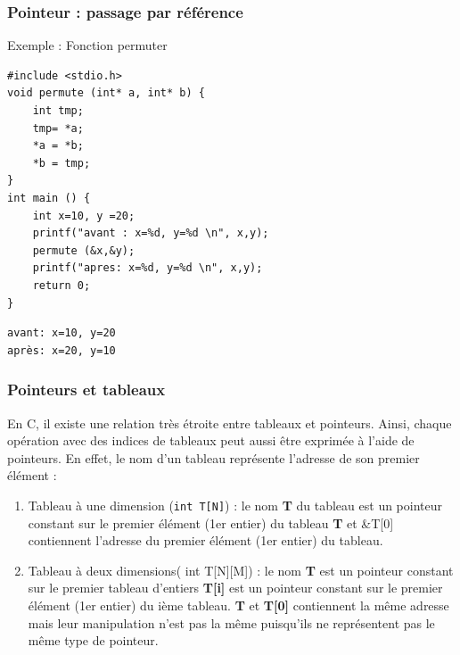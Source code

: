 \documentclass{beamer}
\begin{document}

\begin{frame}[fragile]
\frametitle{Pointeur : passage par référence}

Exemple : Fonction permuter

\begin{verbatim}
#include <stdio.h>
void permute (int* a, int* b) {
    int tmp;
    tmp= *a;
    *a = *b;
    *b = tmp;
}
int main () {
    int x=10, y =20;
    printf("avant : x=%d, y=%d \n", x,y);
    permute (&x,&y);
    printf("apres: x=%d, y=%d \n", x,y);
    return 0;
}
\end{verbatim}
{\tiny
\begin{verbatim}
avant: x=10, y=20
après: x=20, y=10
\end{verbatim}
}
\end{frame}



\begin{frame}[fragile]
\frametitle{Pointeurs et tableaux}
En C, il existe une relation très étroite entre tableaux et pointeurs. Ainsi, chaque opération avec des indices de tableaux peut aussi être exprimée à l'aide de pointeurs. En effet, le nom d'un tableau représente l'adresse de son premier élément :
\begin{enumerate}
\item Tableau à une dimension ({\tt int T[N]}) :
 le nom {\bf T} du tableau est un pointeur constant sur le premier élément (1er entier) du tableau {\bf T} et \&T[0] contiennent l'adresse du premier élément (1er entier) du tableau.
 \item Tableau à deux dimensions( int T[N][M]) :
 le nom {\bf T} est un pointeur constant sur le premier tableau d'entiers
 {\bf T[i]}  est un pointeur constant sur le premier élément (1er entier) du ième tableau.
 {\bf T} et {\bf T[0]} contiennent la même adresse mais leur manipulation n'est pas la même puisqu'ils ne représentent pas le même type de pointeur.
\end{enumerate}
 


\end{frame}
\end{document}
